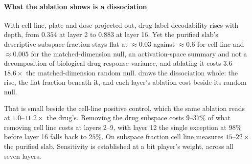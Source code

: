 \paragraph{What the ablation shows is a dissociation} With cell line, plate and
dose projected out, drug-label decodability rises with depth, from $0.354$ at
layer 2 to $0.883$ at layer 16. Yet the purified slab's descriptive subspace
fraction stays flat at $\approx 0.03$ against $\approx 0.6$ for cell line and
$\approx 0.005$ for the matched-dimension null, an
activation-space summary and not a decomposition of biological drug-response
variance, and ablating it costs $3.6$--$18.6\times$ the matched-dimension random
null.  draws the dissociation whole: the rise, the flat
fraction beneath it, and each layer's ablation cost beside its random null.

That is small beside the cell-line positive control, which the same ablation
reads at $1.0$--$11.2\times$ the drug's. Removing the drug subspace costs
$9$--$37\%$ of what removing cell line costs at layers 2--9, with layer 12 the
single exception at $98\%$ before layer 16 falls back to $25\%$. On subspace
fraction cell line measures $15$--$22\times$ the purified slab. Sensitivity is
established at a bit player's weight, across all seven layers.


